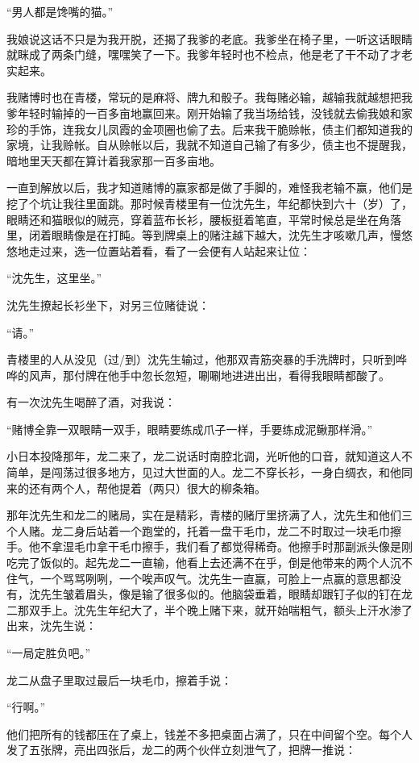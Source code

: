 \documentclass[12pt,UTF8]{ctexbook}
\begin{document}
“男人都是馋嘴的猫。”

我娘说这话不只是为我开脱，还揭了我爹的老底。我爹坐在椅子里，一听这话眼睛就眯成了两条门缝，嘿嘿笑了一下。我爹年轻时也不检点，他是老了干不动了才老实起来。

我赌博时也在青楼，常玩的是麻将、牌九和骰子。我每赌必输，越输我就越想把我爹年轻时输掉的一百多亩地赢回来。刚开始输了我当场给钱，没钱就去偷我娘和家珍的手饰，连我女儿凤霞的金项圈也偷了去。后来我干脆赊帐，债主们都知道我的家境，让我赊帐。自从赊帐以后，我就不知道自己输了有多少，债主也不提醒我，暗地里天天都在算计着我家那一百多亩地。

一直到解放以后，我才知道赌博的赢家都是做了手脚的，难怪我老输不赢，他们是挖了个坑让我往里面跳。那时候青楼里有一位沈先生，年纪都快到六十（岁）了，眼睛还和猫眼似的贼亮，穿着蓝布长衫，腰板挺着笔直，平常时候总是坐在角落里，闭着眼睛像是在打盹。等到牌桌上的赌注越下越大，沈先生才咳嗽几声，慢悠悠地走过来，选一位置站着看，看了一会便有人站起来让位：

“沈先生，这里坐。”

沈先生撩起长衫坐下，对另三位赌徒说：

“请。”

青楼里的人从没见（过/到）沈先生输过，他那双青筋突暴的手洗牌时，只听到哗哗的风声，那付牌在他手中忽长忽短，唰唰地进进出出，看得我眼睛都酸了。

有一次沈先生喝醉了酒，对我说：

“赌博全靠一双眼睛一双手，眼睛要练成爪子一样，手要练成泥鳅那样滑。”

小日本投降那年，龙二来了，龙二说话时南腔北调，光听他的口音，就知道这人不简单，是闯荡过很多地方，见过大世面的人。龙二不穿长衫，一身白绸衣，和他同来的还有两个人，帮他提着（两只）很大的柳条箱。

那年沈先生和龙二的赌局，实在是精彩，青楼的赌厅里挤满了人，沈先生和他们三个人赌。龙二身后站着一个跑堂的，托着一盘干毛巾，龙二不时取过一块毛巾擦手。他不拿湿毛巾拿干毛巾擦手，我们看了都觉得稀奇。他擦手时那副派头像是刚吃完了饭似的。起先龙二一直输，他看上去还满不在乎，倒是他带来的两个人沉不住气，一个骂骂咧咧，一个唉声叹气。沈先生一直赢，可脸上一点赢的意思都没有，沈先生皱着眉头，像是输了很多似的。他脑袋垂着，眼睛却跟钉子似的钉在龙二那双手上。沈先生年纪大了，半个晚上赌下来，就开始喘粗气，额头上汗水渗了出来，沈先生说：

“一局定胜负吧。”

龙二从盘子里取过最后一块毛巾，擦着手说：

“行啊。”

他们把所有的钱都压在了桌上，钱差不多把桌面占满了，只在中间留个空。每个人发了五张牌，亮出四张后，龙二的两个伙伴立刻泄气了，把牌一推说：
\end{document}
